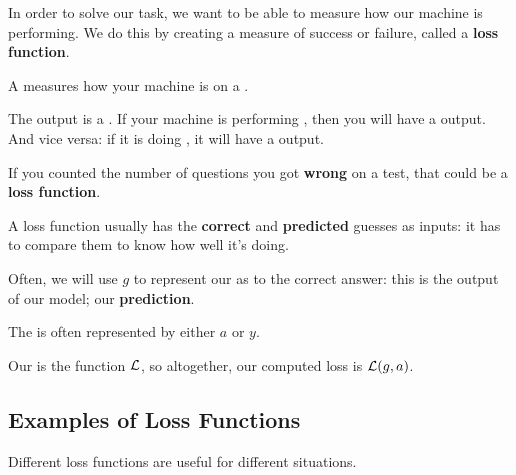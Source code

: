         In order to solve our task, we want to be able to measure how our machine is performing. We do this by creating a measure of success or failure, called a \textbf{loss function}.\\
    
        \begin{definition}
            A   measures how  your machine is  on a .
            
            The output is a . If your machine is performing , then you will have a  output. And vice versa: if it is doing , it will have a  output.
        \end{definition}
        
        \miniex If you counted the number of questions you got \textbf{wrong} on a test, that could be a \textbf{loss function}.
        
        A loss function usually has the \textbf{correct} and \textbf{predicted} guesses as inputs: it has to compare them to know how well it's doing.\\
        
        \begin{notation}
            Often, we will use $g$ to represent our  as to the correct answer: this is the output of our model; our \textbf{prediction}.
            
            The  is often represented by either $a$ or $y$.
            
            Our  is the function $\mathcal{L}$, so altogether, our computed loss is $\mathcal{L}(g,a)$.
        \end{notation}
    
    \subsection{Examples of Loss Functions}
    
        Different loss functions are useful for different situations.
        
